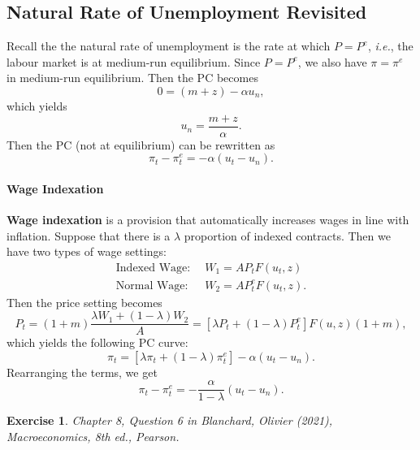 \documentclass[12pt]{article}
\newtheorem{exercise}{Exercise}
\begin{document}
\subsection*{Natural Rate of Unemployment Revisited}
Recall the the natural rate of unemployment is the rate at which $P=P^e$, \textit{i.e.}, the labour market is at medium-run equilibrium. Since $P=P^e$, we also have $\pi=\pi^e$ in medium-run equilibrium. Then the PC becomes
\[0 = (m+z)-\alpha u_n,\]
which yields
\[u_n = \frac{m+z}{\alpha}.\]
Then the PC (not at equilibrium) can be rewritten as
\[\pi_t - \pi_t^e = -\alpha (u_t - u_n).\]

\paragraph{Wage Indexation}
\textbf{Wage indexation} is a provision that automatically increases wages in line with inflation. Suppose that there is a $\lambda$ proportion of indexed contracts. Then we have two types of wage settings:
\begin{align*}
    \text{Indexed Wage: }\, & W_1 = A P_t F(u_t,z)\\
    \text{Normal Wage: }\, & W_2 = A P^e_t F(u_t,z).
\end{align*}
Then the price setting becomes
\[P_t = (1+m)\frac{\lambda W_1 + (1-\lambda) W_2}{A} = [\lambda P_t + (1-\lambda)P_t^e] F(u,z)(1+m),\]
which yields the following PC curve:
\[\pi_t = [\lambda\pi_t + (1-\lambda)\pi_t^e]-\alpha(u_t-u_n).\]
Rearranging the terms, we get
\[\pi_t-\pi_t^e = -\frac{\alpha}{1-\lambda}(u_t-u_n).\]

\begin{exercise}
    Chapter 8, Question 6 in Blanchard, Olivier (2021), \textit{Macroeconomics}, 8th ed., Pearson.
\end{exercise}
\end{document}
